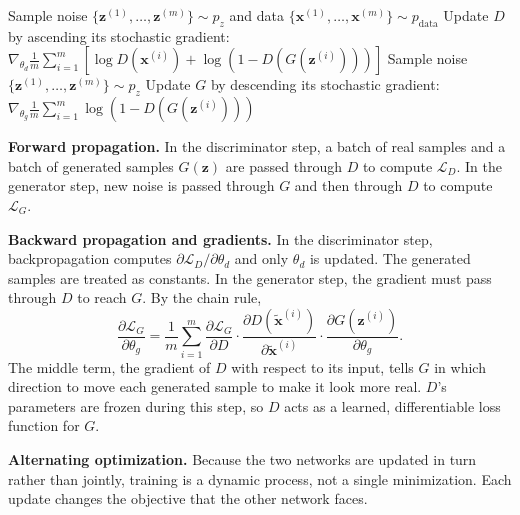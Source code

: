 \documentclass[conference]{IEEEtran}
\newcommand{\pdata}{p_{\mathrm{data}}}
\begin{document}
\begin{algorithm}[t]
\caption{Mini-batch stochastic gradient training of a GAN~\cite{goodfellow2014}}
\label{alg:gan}
\begin{algorithmic}[1]
\STATE Sample noise $\{\mathbf{z}^{(1)},\dots,\mathbf{z}^{(m)}\}\sim p_z$ and data $\{\mathbf{x}^{(1)},\dots,\mathbf{x}^{(m)}\}\sim\pdata$
\STATE Update $D$ by ascending its stochastic gradient:\\
$\nabla_{\theta_d}\frac{1}{m}\sum_{i=1}^{m}\left[\log D(\mathbf{x}^{(i)})+\log\left(1-D(G(\mathbf{z}^{(i)}))\right)\right]$
\ENDFOR
\STATE Sample noise $\{\mathbf{z}^{(1)},\dots,\mathbf{z}^{(m)}\}\sim p_z$
\STATE Update $G$ by descending its stochastic gradient:\\
$\nabla_{\theta_g}\frac{1}{m}\sum_{i=1}^{m}\log\left(1-D(G(\mathbf{z}^{(i)}))\right)$
\ENDFOR
\end{algorithmic}
\end{algorithm}

\textbf{Forward propagation.} In the discriminator step, a batch of real samples and a batch of generated samples $G(\mathbf{z})$ are passed through $D$ to compute $\mathcal{L}_D$. In the generator step, new noise is passed through $G$ and then through $D$ to compute $\mathcal{L}_G$.

\textbf{Backward propagation and gradients.} In the discriminator step, backpropagation computes $\partial\mathcal{L}_D/\partial\theta_d$ and only $\theta_d$ is updated. The generated samples are treated as constants. In the generator step, the gradient must pass through $D$ to reach $G$. By the chain rule,
\begin{equation}
\frac{\partial\mathcal{L}_G}{\partial\theta_g}=\frac{1}{m}\sum_{i=1}^{m}\frac{\partial\mathcal{L}_G}{\partial D}\cdot\frac{\partial D(\tilde{\mathbf{x}}^{(i)})}{\partial\tilde{\mathbf{x}}^{(i)}}\cdot\frac{\partial G(\mathbf{z}^{(i)})}{\partial\theta_g}.
\end{equation}
The middle term, the gradient of $D$ with respect to its input, tells $G$ in which direction to move each generated sample to make it look more real. $D$'s parameters are frozen during this step, so $D$ acts as a learned, differentiable loss function for $G$.

\textbf{Alternating optimization.} Because the two networks are updated in turn rather than jointly, training is a dynamic process, not a single minimization. Each update changes the objective that the other network faces.
\end{document}
